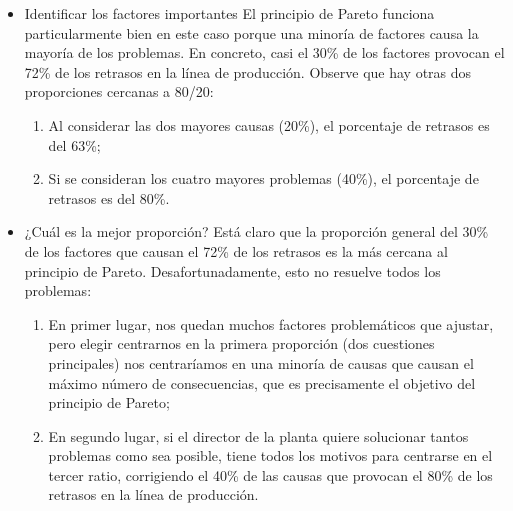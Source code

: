 \documentclass{article}
\theoremstyle{mytheoremstyle}
\theoremstyle{mytheoremstyle}
\theoremstyle{myproblemstyle}
\begin{document}
\begin{enumerate}
\begin{itemize}
	\item Identificar los factores importantes\newline
	El principio de Pareto funciona particularmente bien en este caso
	porque una minoría de factores causa la mayoría de los problemas.
	En concreto, casi el 30\% de los factores provocan el 72\% de los retrasos
	en la línea de producción. Observe que hay otras dos proporciones
	cercanas a 80/20:
	      \begin{enumerate}
		      \item Al considerar las dos mayores causas (20\%), el
			  porcentaje de retrasos es del 63\%;
		      \item Si se consideran los cuatro mayores problemas (40\%), el
			  porcentaje de retrasos es del 80\%.
	      \end{enumerate}\newpage
		  \item ¿Cuál es la mejor proporción? \newline
		   Está claro que la proporción general del 30\% de los factores que
	causan el 72\% de los retrasos es la más cercana al principio de Pareto.
	Desafortunadamente, esto no resuelve todos los problemas:
	\begin{enumerate}
		\item En primer lugar, nos quedan muchos factores problemáticos
		que ajustar, pero elegir centrarnos en la primera proporción (dos
		cuestiones principales) nos centraríamos en una minoría de causas
		que causan el máximo número de consecuencias, que es precisamente
		el objetivo del principio de Pareto;
		\item En segundo lugar, si el director de la planta quiere solucionar tantos
		problemas como sea posible, tiene todos los motivos para centrarse en el
		tercer ratio, corrigiendo el 40\% de las causas que provocan el 80\% de
		los retrasos en la línea de producción.
	\end{enumerate}

\end{itemize}
\end{enumerate}
\end{document}
